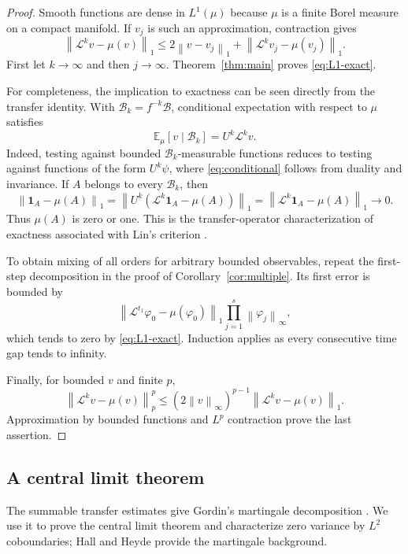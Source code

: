 \documentclass[10pt,a4paper]{amsart}
\newcommand{\E}{\mathbb E}
\newcommand{\Lop}{\mathcal L}
\newcommand{\Bcal}{\mathcal B}
\newcommand{\norm}[1]{\left\lVert #1\right\rVert}
\numberwithin{equation}{section}
\begin{document}
\begin{proof}
Smooth functions are dense in $L^1(\mu)$ because $\mu$ is a finite Borel measure on a compact manifold. If $v_j$ is such an approximation, contraction gives
\[
 \norm{\Lop^kv-\mu(v)}_1
 \le2\norm{v-v_j}_1+\norm{\Lop^kv_j-\mu(v_j)}_1.
\]
First let $k\to\infty$ and then $j\to\infty$. Theorem~\ref{thm:main} proves \eqref{eq:L1-exact}.

For completeness, the implication to exactness can be seen directly from the transfer identity. With $\Bcal_k=f^{-k}\Bcal$, conditional expectation with respect to $\mu$ satisfies
\begin{equation}\label{eq:conditional}
 \E_\mu[v\mid\Bcal_k]=U^k\Lop^kv.
\end{equation}
Indeed, testing against bounded $\Bcal_k$-measurable functions reduces to testing against functions of the form $U^k\psi$, where \eqref{eq:conditional} follows from duality and invariance. If $A$ belongs to every $\Bcal_k$, then
\[
 \norm{\mathbf1_A-\mu(A)}_1
 =\norm{U^k(\Lop^k\mathbf1_A-\mu(A))}_1
 =\norm{\Lop^k\mathbf1_A-\mu(A)}_1\longrightarrow0.
\]
Thus $\mu(A)$ is zero or one. This is the transfer-operator characterization of exactness associated with Lin's criterion \cite{Lin71}.

To obtain mixing of all orders for arbitrary bounded observables, repeat the first-step decomposition in the proof of Corollary~\ref{cor:multiple}. Its first error is bounded by
\[
 \norm{\Lop^{t_1}\varphi_0-\mu(\varphi_0)}_1
 \prod_{j=1}^s\norm{\varphi_j}_\infty,
\]
which tends to zero by \eqref{eq:L1-exact}. Induction applies as every consecutive time gap tends to infinity.

Finally, for bounded $v$ and finite $p$,
\begin{equation}\label{eq:Lp-interpolation}
 \norm{\Lop^kv-\mu(v)}_p^p
 \le(2\norm{v}_\infty)^{p-1}
       \norm{\Lop^kv-\mu(v)}_1.
\end{equation}
Approximation by bounded functions and $L^p$ contraction prove the last assertion.
\end{proof}

\subsection{A central limit theorem}

The summable transfer estimates give Gordin's martingale decomposition \cite{Gordin69}. We use it to prove the central limit theorem and characterize zero variance by $L^2$ coboundaries; Hall and Heyde \cite{HallHeyde80} provide the martingale background.
\end{document}
